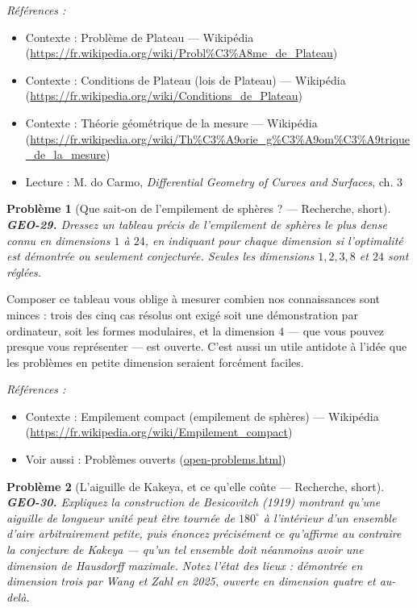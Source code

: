\documentclass[11pt]{article}
\newtheorem{problem}{Problème}
\newenvironment{refs}{\par\small\noindent\emph{Références :}\begin{itemize}\setlength\itemsep{0pt}}{\end{itemize}\normalsize}
\begin{document}
\begin{refs}
\item Contexte : Problème de Plateau --- Wikipédia (\url{https://fr.wikipedia.org/wiki/Probl%C3%A8me_de_Plateau})
\item Contexte : Conditions de Plateau (lois de Plateau) --- Wikipédia (\url{https://fr.wikipedia.org/wiki/Conditions_de_Plateau})
\item Contexte : Théorie géométrique de la mesure --- Wikipédia (\url{https://fr.wikipedia.org/wiki/Th%C3%A9orie_g%C3%A9om%C3%A9trique_de_la_mesure})
\item Lecture : M. do Carmo, \textit{Differential Geometry of Curves and Surfaces}, ch. 3
\end{refs}

\bigskip

\begin{problem}[{Que sait-on de l'empilement de sphères ? --- Recherche, short}]
\textbf{GEO-29.} Dressez un tableau précis de l'empilement de sphères le plus dense connu en dimensions $ 1 $ à $ 24 $, en indiquant pour chaque dimension si l'optimalité est \textit{démontrée} ou seulement \textit{conjecturée}. Seules les dimensions $ 1, 2, 3, 8 $ et $ 24 $ sont réglées.
\end{problem}

\noindent Composer ce tableau vous oblige à mesurer combien nos connaissances sont minces : trois des cinq cas résolus ont exigé soit une démonstration par ordinateur, soit les formes modulaires, et la dimension $ 4 $ --- que vous pouvez presque vous représenter --- est ouverte. C'est aussi un utile antidote à l'idée que les problèmes en petite dimension seraient forcément faciles.

\begin{refs}
\item Contexte : Empilement compact (empilement de sphères) --- Wikipédia (\url{https://fr.wikipedia.org/wiki/Empilement_compact})
\item Voir aussi : Problèmes ouverts (\url{open-problems.html})
\end{refs}

\bigskip

\begin{problem}[{L'aiguille de Kakeya, et ce qu'elle coûte --- Recherche, short}]
\textbf{GEO-30.} Expliquez la construction de Besicovitch (1919) montrant qu'une aiguille de longueur unité peut être tournée de $ 180^\circ $ à l'intérieur d'un ensemble d'aire arbitrairement petite, puis énoncez précisément ce qu'affirme au contraire la conjecture de Kakeya --- qu'un tel ensemble doit néanmoins avoir une dimension de Hausdorff maximale. Notez l'état des lieux : démontrée en dimension trois par Wang et Zahl en 2025, ouverte en dimension quatre et au-delà.
\end{problem}
\end{document}
